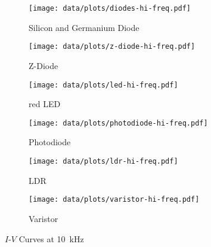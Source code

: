 \begin{figure}[tbp]
	\centering

	\begin{subfigure}{\ivsubfigwidth}
		\centering
		\texttt{[image: data/plots/diodes-hi-freq.pdf]}
		\caption{Silicon and Germanium Diode}
		\label{plot:iv-hi:si-ge-diode}
	\end{subfigure}
	\begin{subfigure}{\ivsubfigwidth}
		\centering
		\texttt{[image: data/plots/z-diode-hi-freq.pdf]}
		\caption{Z-Diode}
		\label{plot:iv-hi:z-diode}
	\end{subfigure}

	\begin{subfigure}{\ivsubfigwidth}
		\centering
		\texttt{[image: data/plots/led-hi-freq.pdf]}
		\caption{red LED}
		\label{plot:iv-hi:leds}
	\end{subfigure}
	\begin{subfigure}{\ivsubfigwidth}
		\centering
		\texttt{[image: data/plots/photodiode-hi-freq.pdf]}
		\caption{Photodiode}
		\label{plot:iv-hi:photodiode}
	\end{subfigure}

	\begin{subfigure}{\ivsubfigwidth}
		\centering
		\texttt{[image: data/plots/ldr-hi-freq.pdf]}
		\caption{LDR}
		\label{plot:iv-hi:ldr}
	\end{subfigure}
	\begin{subfigure}{\ivsubfigwidth}
		\centering
		\texttt{[image: data/plots/varistor-hi-freq.pdf]}
		\caption{Varistor}
		\label{plot:iv-hi:varistor}
	\end{subfigure}

	\caption{$I$-$V$ Curves at \SI{10}{\kHz}}
	\label{plots:iv-hi}
\end{figure}
